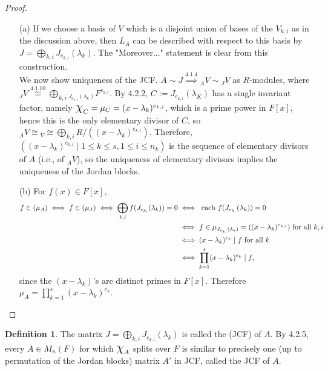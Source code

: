 \documentclass[11pt]{book}
\theoremstyle{definition}   \newtheorem{defn}[counter]{Definition} %
\newcommand{\Chi}{\mbox{\Large $\chi$}}
\newcommand{\vs}{\vspace{8pt}}
\numberwithin{counter}{chapter}
\begin{document}
\begin{proof}\ 
\begin{enumerate}
\item[(a)] If we choose a basis of $V$ which is a disjoint union of bases of the $V_{k,i}$ as in the discussion above, then $L_A$ can be described with respect to this basis by $J = \bigoplus_{k,i} J_{e_{k,i}}(\lambda_k)$. The "Moreover..." statement is clear from this construction. \\

We now show uniqueness of the JCF. $A \sim J \overset{4.1.4}{\implies} {_AV} \sim {_JV}$ as $R$-modules, where $_JV \overset{4.1.10}{\cong} \bigoplus_{k,i} {_{J_{e_{k,i}}(\lambda_k)} F^{e_{k,i}}}$. By 4.2.2, $C := J_{e_{k,i}}(\lambda_K)$ has a single invariant factor, namely $\Chi_C = \mu_C = (x-\lambda_k)^{e_{k,i}}$, which is a prime power in $F[x]$, hence this is the only elementary divisor of $C$, so ${_AV} \cong {_V} \cong \bigoplus_{k,i} R/((x-\lambda_k)^{e_{k,i}})$. Therefore, $((x-\lambda_k)^{e_{k,i}} \mid 1 \leq k \leq s, 1 \leq i \leq n_k)$ is the sequence of elementary divisors of $A$ (i.e., of ${_AV}$), so the uniqueness of elementary divisors implies the uniqueness of the Jordan blocks.
\item[(b)] For $f(x) \in F[x]$, 
\begin{align*}
f \in (\mu_A) \iff f \in (\mu_J) \iff \bigoplus_{k,i} f(J_{e_{k,}}(\lambda_k)) = 0 &\iff \textnormal{ each } f(J_{e_{k,}}(\lambda_k)) = 0 \\
& \iff f \in \mu_{J_{e_{k,}}(\lambda_k)} = ((x-\lambda_k)^{e_{k,i}}) \textnormal{ for all }k,i \\
&\iff (x-\lambda_k)^{e_k} \mid f \textnormal{ for all } k \\
&\iff \prod_{k=1}^s (x-\lambda_k)^{e_k} \mid f, 
\end{align*} 
since the $(x-\lambda_k)$'s are distinct primes in $F[x]$. Therefore $\mu_A = \prod_{k=1}^s (x-\lambda_k)^{e_k}$. 
\end{enumerate}
\end{proof}

\vs

\begin{defn}
The matrix $J = \bigoplus_{k,i} J_{e_{k,i}}(\lambda_k)$ is called the  (JCF) of $A$. By 4.2.5, every $A \in M_n(F)$ for which $\Chi_A$ splits over $F$ is similar to precisely one (up to permutation of the Jordan blocks) matrix $A'$ in JCF, called the JCF of $A$.
\end{defn}
\end{document}
